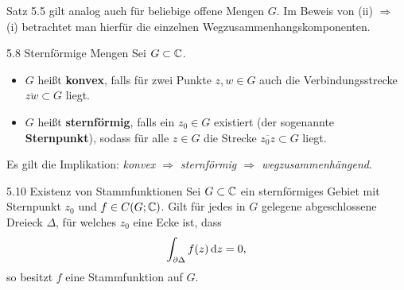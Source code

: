 \begin{tcolorbox}[colback=blue!5!white, colframe=blue!75!black, title={Bemerkung 5.6}]
Satz 5.5 gilt analog auch für beliebige offene Mengen $G$. Im Beweis von (ii) $\Rightarrow$ (i) betrachtet man hierfür die einzelnen Wegzusammenhangskomponenten.
\end{tcolorbox}

\begin{defi}{5.8 Sternförmige Mengen}
Sei $G \subset \mathbb{C}$.
\begin{itemize}
    \item[i)] $G$ heißt \textbf{konvex}, falls für zwei Punkte $z, w \in G$ auch die Verbindungsstrecke $\overline{zw} \subset G$ liegt.
    \item[ii)] $G$ heißt \textbf{sternförmig}, falls ein $z_0 \in G$ existiert (der sogenannte \textbf{Sternpunkt}), sodass für alle $z \in G$ die Strecke $\overline{z_0 z} \subset G$ liegt.
\end{itemize}
Es gilt die Implikation: \textit{konvex $\Rightarrow$ sternförmig $\Rightarrow$ wegzusammenhängend}.
\end{defi}

\begin{satz}{5.10 Existenz von Stammfunktionen}
Sei $G \subset \mathbb{C}$ ein sternförmiges Gebiet mit Sternpunkt $z_0$ und $f \in C(G; \mathbb{C})$. Gilt für jedes in $G$ gelegene abgeschlossene Dreieck $\Delta$, für welches $z_0$ eine Ecke ist, dass
\[
    \int_{\partial \Delta} f(z) \, \mathrm{d}z = 0,
\]
so besitzt $f$ eine Stammfunktion auf $G$.
\end{satz}